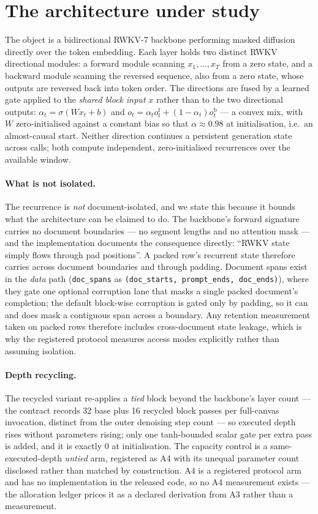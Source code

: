 \documentclass[11pt]{article}
\begin{document}
\section{The architecture under study}
\label{sec:architecture}

The object is a bidirectional RWKV-7 backbone performing masked diffusion directly over
the token embedding. Each layer holds two distinct RWKV directional modules: a forward
module scanning $x_1,\dots,x_T$ from a zero state, and a backward module scanning the
reversed sequence, also from a zero state, whose outputs are reversed back into token
order. The directions are fused by a learned gate applied to the \emph{shared block
input} $x$ rather than to the two directional outputs:
$\alpha_t=\sigma(W x_t + b)$ and
$o_t=\alpha_t o^{\mathrm f}_t+(1-\alpha_t)o^{\mathrm b}_t$ --- a convex mix, with $W$
zero-initialised against a constant bias so that $\alpha\approx0.98$ at initialisation,
i.e.\ an almost-causal start. Neither direction continues a persistent generation state
across calls; both compute independent, zero-initialised recurrences over the available
window.

\paragraph{What is not isolated.} The recurrence is \emph{not} document-isolated, and we
state this because it bounds what the architecture can be claimed to do. The backbone's
forward signature carries no document boundaries --- no segment lengths and no attention
mask --- and the implementation documents the consequence directly: ``RWKV state simply
flows through pad positions''. A packed row's recurrent state therefore carries across
document boundaries and through padding. Document spans exist in the \emph{data} path
(\texttt{doc\_spans} as \texttt{(doc\_starts, prompt\_ends, doc\_ends)}), where they gate
one optional corruption lane that masks a single packed document's completion; the
default block-wise corruption is gated only by padding, so it can and does mask a
contiguous span across a boundary. Any retention measurement taken on packed rows
therefore includes cross-document state leakage, which is why the registered protocol
measures access modes explicitly rather than assuming isolation.

\paragraph{Depth recycling.} The recycled variant re-applies a \emph{tied} block beyond
the backbone's layer count --- the contract records 32 base plus 16 recycled block passes
per full-canvas invocation, distinct from the outer denoising step count --- so executed
depth rises without parameters rising; only one tanh-bounded scalar gate per extra pass is
added, and it is exactly $0$ at initialisation. The capacity control is a
same-executed-depth \emph{untied} arm, registered as A4 with its unequal parameter count
disclosed rather than matched by construction. A4 is a registered protocol arm and has no
implementation in the released code, so no A4 measurement exists --- the allocation
ledger prices it as a declared derivation from A3 rather than a measurement.
\end{document}
